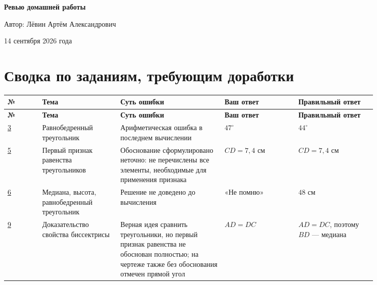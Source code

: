 \documentclass[12pt,a4paper]{article}
\begin{document}
\begin{titlepage}
\centering
\vspace*{0.25\textheight}
{\Huge\bfseries Ревью домашней работы\par}
\vspace{1.8cm}
{\Large Автор: Лёвин Артём Александрович\par}
\vspace{0.8cm}
{\large 14 сентября 2026 года\par}
\vfill
{}
\end{titlepage}

\newpage
\section*{Сводка по заданиям, требующим доработки}
\small
{\setlength{\tabcolsep}{3pt}%
\begin{longtable}{@{}>{\centering\arraybackslash}p{0.08\linewidth} p{0.18\linewidth} p{0.24\linewidth} p{0.17\linewidth} p{0.18\linewidth}@{}}
\toprule
\textbf{№} & \textbf{Тема} & \textbf{Суть ошибки} &
\textbf{Ваш ответ} & \textbf{Правильный ответ} \\
\midrule
\endfirsthead
\toprule
\textbf{№} & \textbf{Тема} & \textbf{Суть ошибки} &
\textbf{Ваш ответ} & \textbf{Правильный ответ} \\
\midrule
\endhead
\hyperref[task:3]{3} &
Равнобедренный треугольник &
Арифметическая ошибка в последнем вычислении &
$47^\circ$ &
$44^\circ$ \\

\addlinespace
\hyperref[task:5]{5} &
Первый признак равенства треугольников &
Обоснование сформулировано неточно: не перечислены все элементы, необходимые для применения признака &
$CD=7{,}4$ см &
$CD=7{,}4$ см \\

\addlinespace
\hyperref[task:6]{6} &
Медиана, высота, равнобедренный треугольник &
Решение не доведено до вычисления &
«Не помню» &
$48$ см \\

\addlinespace
\hyperref[task:9]{9} &
Доказательство свойства биссектрисы &
Верная идея сравнить треугольники, но первый признак равенства не обоснован полностью; на чертеже также без обоснования отмечен прямой угол &
$AD=DC$ &
$AD=DC$, поэтому $BD$ --- медиана \\
\bottomrule
\end{longtable}
}
\normalsize
\end{document}
